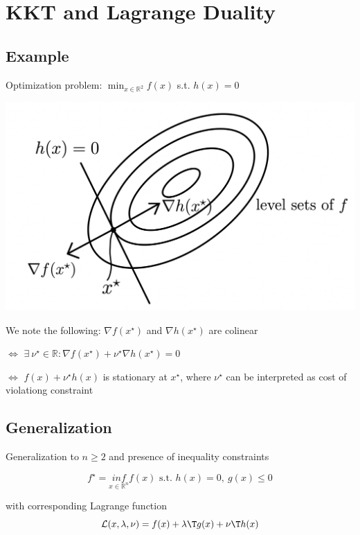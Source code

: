 \section{KKT and Lagrange Duality}

\subsection{Example}

Optimization problem:
$\min _{x \in \mathbb{R}^2} f(x)$ s.t. $h(x)=0$

\includegraphics[width=\columnwidth]{images/op_eq_constraints.png}

We note the following:
$\nabla f(x^\star)$ and $\nabla h(x^\star)$ are colinear


$\Leftrightarrow$
$\exists\ \nu^\star \in \mathbb{R}: \nabla f(x^\star)+\nu^\star\nabla h(x^\star) = 0$

$\Leftrightarrow$
$f(x)+\nu^\star h(x)$ is stationary at $x^\star$,
where $\nu^\star$ can be interpreted as cost of violationg constraint

\subsection{Generalization}

Generalization to $n \ge 2$ and presence of inequality constraints

\begin{equation}
	f^\star = \underset{x \in \mathcal{\mathbb{R}}^n}{inf}f(x) \text{ s.t. } h(x)=0,\ g(x) \le 0
	\label{eq:dual}
\end{equation}

with corresponding Lagrange function
\begin{equation}
	\mathcal{L}(x,\lambda,\nu) = f(x) + \lambda\T g(x)+\nu\T h(x)
\end{equation}

